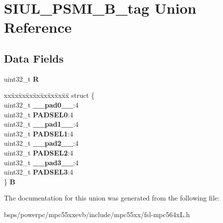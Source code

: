 \hypertarget{unionSIUL__PSMI__32B__tag}{}\section{S\+I\+U\+L\+\_\+\+P\+S\+M\+I\+\_\+B\+\_\+tag Union Reference}
\label{unionSIUL__PSMI__32B__tag}
\subsection*{Data Fields}
\begin{DoxyCompactItemize}
\item 
\mbox{\label{unionSIUL__PSMI__32B__tag_ae3d36ddff1b8ae856b95c573210b1568}} 
uint32\+\_\+t {\bfseries R}
\item 
\mbox{\label{unionSIUL__PSMI__32B__tag_a3b81765cc5051c1ded72ae5a9a3b2e07}} 
\begin{tabbing}
xx\=xx\=xx\=xx\=xx\=xx\=xx\=xx\=xx\=\kill
struct \{\\
\>uint32\_t {\bfseries \_\_pad0\_\_}:4\\
\>uint32\_t {\bfseries PADSEL0}:4\\
\>uint32\_t {\bfseries \_\_pad1\_\_}:4\\
\>uint32\_t {\bfseries PADSEL1}:4\\
\>uint32\_t {\bfseries \_\_pad2\_\_}:4\\
\>uint32\_t {\bfseries PADSEL2}:4\\
\>uint32\_t {\bfseries \_\_pad3\_\_}:4\\
\>uint32\_t {\bfseries PADSEL3}:4\\
\} {\bfseries B}\\

\end{tabbing}\end{DoxyCompactItemize}


The documentation for this union was generated from the following file\+:\begin{DoxyCompactItemize}
\item 
bsps/powerpc/mpc55xxevb/include/mpc55xx/fsl-\/mpc564x\+L.\+h\end{DoxyCompactItemize}
